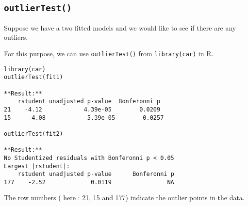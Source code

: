 \documentclass[residuals.tex]{subfiles}
\begin{document}
\subsection*{\texttt{outlierTest()}}
Suppose we have a two fitted models and we would like to see if there are any outliers. 

For this purpose, we can use \texttt{outlierTest()} from \texttt{library(car)} in R. 



\begin{framed}
\begin{verbatim}
library(car)
outlierTest(fit1)   

**Result:**
    rstudent unadjusted p-value  Bonferonni p
21    -4.12            4.39e-05        0.0209
15     -4.08            5.39e-05        0.0257

outlierTest(fit2)   

**Result:**
No Studentized residuals with Bonferonni p < 0.05
Largest |rstudent|:
    rstudent unadjusted p-value      Bonferonni p
177    -2.52             0.0119                NA
\end{verbatim}
\end{framed}

The row numbers ( here : 21, 15 and 177) indicate the outlier points in the data.
\end{document}

